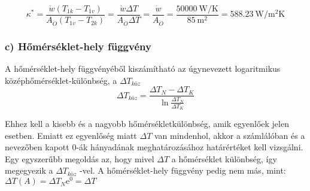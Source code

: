 \begin{equation}
\kappa^*=\dfrac{\dot{w} \left(T_{1k} - T_{1v}\right)}{A_{\ddot{O}} \left(T_{1v} - T_{2k}\right)} 
=\dfrac{\dot{w} \Delta T}{A_{\ddot{O}} \Delta T}
=\dfrac{\dot{w}}{A_{\ddot{O}}}
=\dfrac{\SI{50000}{\watt\per\kelvin}}{\SI{85}{\meter\squared}}
=\SI{588.23}{\watt\per\meter\squared\kelvin}
\end{equation}

\vspace{5mm}
\subsubsection*{c) Hőmérséklet-hely függvény}
  A hőmérséklet-hely függvényéből kiszámítható az úgynevezett  logaritmikus középhőmérséklet-különbség, a $\Delta T_{\textit{köz}}$   
\begin{equation}
\Delta T_{\textit{köz}}=\dfrac{\Delta T_N - \Delta T_K}{\ln\frac{\Delta T_N}{\Delta T_K}}
\end{equation}

Ehhez kell a kisebb és a nagyobb hőmérsékletkülönbség, amik egyenlőek jelen esetben. Emiatt ez egyenlőség miatt $\Delta T$ van mindenhol, akkor a számlálóban és a nevezőben kapott 0-ák hányadának meghatározásához határértéket kell vizsgálni. Egy egyszerűbb megoldás az, hogy mivel $\Delta T$ a hőmérséklet különbség, így megegyezik a $\Delta T_{\textit{köz}}$ -vel. A hőmérséklet-hely függvény pedig nem más, mint: $\Delta T(A) = \Delta T_{N}\mathrm{e}^{0} = \Delta T$

